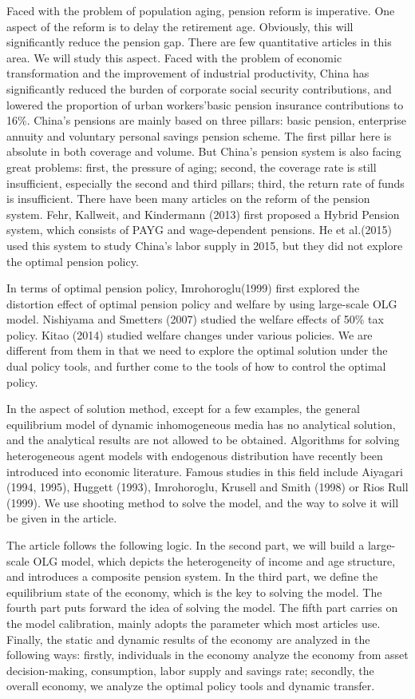 \documentclass{article}
\begin{document}
    Faced with the problem of population aging, pension reform is imperative. One aspect of the reform is to delay the retirement age. Obviously, this will significantly reduce the pension gap. There are few quantitative articles in this area. We will study this aspect. Faced with the problem of economic transformation and the improvement of industrial productivity, China has significantly reduced the burden of corporate social security contributions, and lowered the proportion of urban workers'basic pension insurance contributions to 16\%. China's pensions are mainly based on three pillars: basic pension, enterprise annuity and voluntary personal savings pension scheme. The first pillar here is absolute in both coverage and volume. But China's pension system is also facing great problems: first, the pressure of aging; second, the coverage rate is still insufficient, especially the second and third pillars; third, the return rate of funds is insufficient. There have been many articles on the reform of the pension system. Fehr, Kallweit, and Kindermann (2013) first proposed a Hybrid Pension system, which consists of PAYG and wage-dependent pensions. He et al.(2015) used this system to study China's labor supply in 2015, but they did not explore the optimal pension policy.

    In terms of optimal pension policy, Imrohoroglu(1999) first explored the distortion effect of optimal pension policy and welfare by using large-scale OLG model. Nishiyama and Smetters (2007) studied the welfare effects of 50\% tax policy. Kitao (2014) studied welfare changes under various policies. We are different from them in that we need to explore the optimal solution under the dual policy tools, and further come to the tools of how to control the optimal policy.

    In the aspect of solution method, except for a few examples, the general equilibrium model of dynamic inhomogeneous media has no analytical solution, and the analytical results are not allowed to be obtained. Algorithms for solving heterogeneous agent models with endogenous distribution have recently been introduced into economic literature. Famous studies in this field include Aiyagari (1994, 1995), Huggett (1993), Imrohoroglu, Krusell and Smith (1998) or Rios Rull (1999). We use shooting method to solve the model, and the way to solve it will be given in the article.

    The article follows the following logic. In the second part, we will build a large-scale OLG model, which depicts the heterogeneity of income and age structure, and introduces a composite pension system. In the third part, we define the equilibrium state of the economy, which is the key to solving the model. The fourth part puts forward the idea of solving the model. The fifth part carries on the model calibration, mainly adopts the parameter which most articles use. Finally, the static and dynamic results of the economy are analyzed in the following ways: firstly, individuals in the economy analyze the economy from asset decision-making, consumption, labor supply and savings rate; secondly, the overall economy, we analyze the optimal policy tools and dynamic transfer.
 
\end{document}
